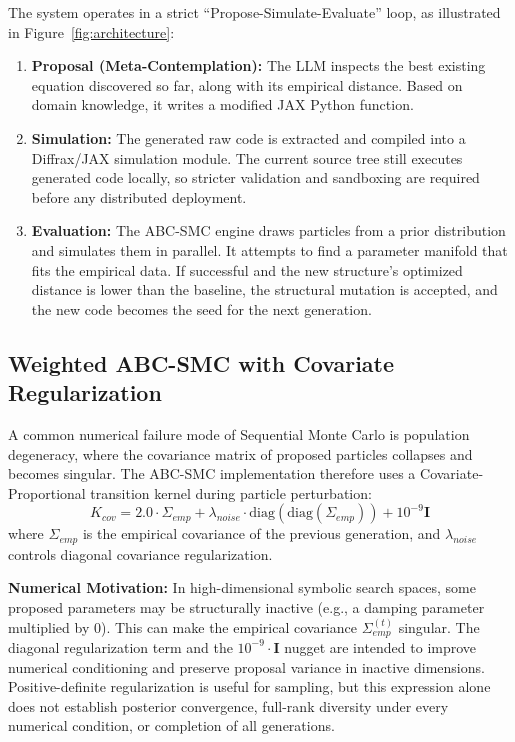 The system operates in a strict ``Propose-Simulate-Evaluate'' loop, as illustrated in Figure~\ref{fig:architecture}:
\begin{enumerate}
    \item \textbf{Proposal (Meta-Contemplation):} The LLM inspects the best existing equation discovered so far, along with its empirical distance. Based on domain knowledge, it writes a modified JAX Python function.
    \item \textbf{Simulation:} The generated raw code is extracted and compiled into a Diffrax/JAX simulation module. The current source tree still executes generated code locally, so stricter validation and sandboxing are required before any distributed deployment.
    \item \textbf{Evaluation:} The ABC-SMC engine draws particles from a prior distribution and simulates them in parallel. It attempts to find a parameter manifold that fits the empirical data. If successful and the new structure's optimized distance is lower than the baseline, the structural mutation is accepted, and the new code becomes the seed for the next generation.
\end{enumerate}

\subsection{Weighted ABC-SMC with Covariate Regularization}
A common numerical failure mode of Sequential Monte Carlo is population degeneracy, where the covariance matrix of proposed particles collapses and becomes singular. The ABC-SMC implementation therefore uses a Covariate-Proportional transition kernel during particle perturbation:
\begin{equation}
    K_{cov} = 2.0 \cdot \Sigma_{emp} + \lambda_{noise} \cdot \text{diag}(\text{diag}(\Sigma_{emp})) + 10^{-9} \mathbf{I}
\end{equation}
where $\Sigma_{emp}$ is the empirical covariance of the previous generation, and $\lambda_{noise}$ controls diagonal covariance regularization.

\textbf{Numerical Motivation:} In high-dimensional symbolic search spaces, some proposed parameters may be structurally inactive (e.g., a damping parameter multiplied by $0$). This can make the empirical covariance $\Sigma_{emp}^{(t)}$ singular. The diagonal regularization term and the $10^{-9} \cdot \mathbf{I}$ nugget are intended to improve numerical conditioning and preserve proposal variance in inactive dimensions. Positive-definite regularization is useful for sampling, but this expression alone does not establish posterior convergence, full-rank diversity under every numerical condition, or completion of all generations.

